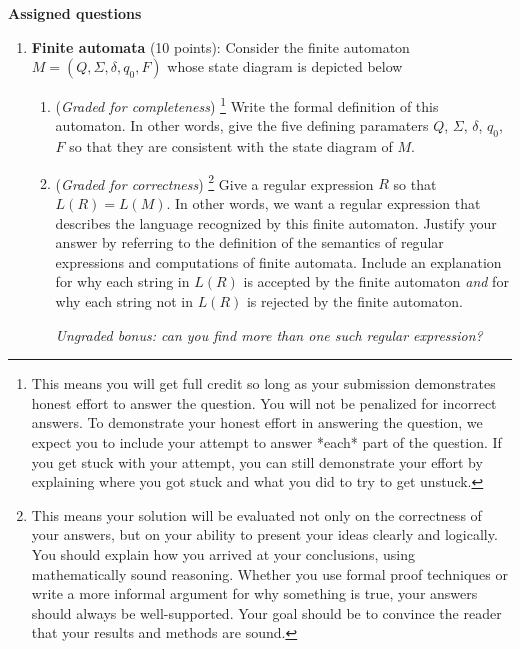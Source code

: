\documentclass[12pt, oneside]{article}
\newcommand{\gradeCorrect}{({\it Graded for correctness}) }
\newcommand{\gradeCorrectFirst}{\gradeCorrect\footnote{This means your solution 
will be evaluated not only on the correctness of your answers, but on your ability
to present your ideas clearly and logically. You should explain how you 
arrived at your conclusions, using
mathematically sound reasoning. Whether you use formal proof techniques or 
write a more informal argument
for why something is true, your answers should always be well-supported. 
Your goal should be to convince the
reader that your results and methods are sound.} }
\newcommand{\gradeComplete}{({\it Graded for completeness}) }
\newcommand{\gradeCompleteFirst}{\gradeComplete\footnote{This means you will 
get full credit so long as your submission demonstrates honest effort to 
answer the question. You will not be penalized for incorrect answers. 
To demonstrate your honest effort in answering the question, we 
expect you to include your attempt to answer *each* part of the question. 
If you get stuck with your attempt, you can still demonstrate 
your effort by explaining where you got stuck and what 
you did to try to get unstuck.} }
\begin{document}
{\bf Assigned questions}
\begin{enumerate}[wide, labelwidth=!, labelindent=0pt]
\item\textbf{Finite automata} (10 points):
Consider the finite automaton $M = (Q, \Sigma, \delta, q_0, F)$ whose state diagram is depicted below
\begin{center}
\end{center}
    \begin{enumerate}
    \item\gradeCompleteFirst Write the formal definition of this automaton. In other words, give the five defining paramaters $Q$, $\Sigma$, $\delta$, $q_0$, $F$ so that they are consistent with the state diagram of $M$.

    \item\gradeCorrectFirst Give a regular expression $R$ so that $L(R) = L(M)$. In other words, we want a regular expression that describes the language 
    recognized by this finite automaton. Justify your answer by referring to the 
    definition of the semantics of regular expressions and computations of finite automata. 
    Include an explanation for why each string in $L(R)$ is accepted by the finite automaton {\it and}
    for why each string not in $L(R)$ is rejected by the finite automaton.

    {\it Ungraded bonus: can you find more than one such regular expression?}


\end{enumerate}
\end{enumerate}
\end{document}
